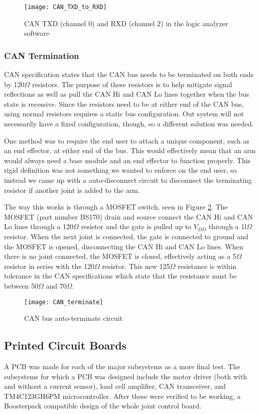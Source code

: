 \begin{figure}[H]
	\centering
	\texttt{[image: CAN\_TXD\_to\_RXD]}
	\caption{CAN TXD (channel 0) and RXD (channel 2) in the logic analyzer software}
	\label{fig:can_TXD_RXD}
\end{figure}

\subsubsection{CAN Termination}
CAN specification states that the CAN bus needs to be terminated on both ends by 120$\Omega$ resistors. The purpose of these resistors is to help mitigate signal reflections as well as pull the CAN Hi and CAN Lo lines together when the bus state is recessive. Since the resistors need to be at either end of the CAN bus, using normal resistors requires a static bus configuration. Out system will not necessarily have a fixed configuration, though, so a different solution was needed.

\noindent One method was to require the end user to attach a unique component, such as an end effector, at either end of the bus. This would effectively mean that an arm would always need a base module and an end effector to function properly. This rigid definition was not something we wanted to enforce on the end user, so instead we came up with a auto-disconnect circuit to disconnect the terminating resistor if another joint is added to the arm.

\noindent The way this works is through a MOSFET switch, seen in Figure \ref{fig:can_terminate_circ}. The MOSFET (part number BS170) drain and source connect the CAN Hi and CAN Lo lines through a 120$\Omega$ resistor and the gate is pulled up to $V_{DD}$ through a 1l$\Omega$ resistor. When the next joint is connected, the gate is connected to ground and the MOSFET is opened, disconnecting the CAN Hi and CAN Lo lines. When there is no joint connected, the MOSFET is closed, effectively acting as a 5$\Omega$ resistor in series with the 120$\Omega$ resistor. This new 125$\Omega$ resistance is within tolerance in the CAN specifications which state that the resistance must be between 50$\Omega$ and 70$\Omega$.

\begin{figure}[H]
	\centering
	\texttt{[image: CAN\_terminate]}
	\caption{CAN bus auto-terminate circuit}
	\label{fig:can_terminate_circ}
\end{figure}

\subsection{Printed Circuit Boards}
A PCB was made for each of the major subsystems as a more final test. The subsystems for which a PCB was designed include the motor driver (both with and without a current sensor), load cell amplifier, CAN transceiver, and TM4C123GH6PM microcontroller. After these were verified to be working, a Boosterpack compatible design of the whole joint control board.

